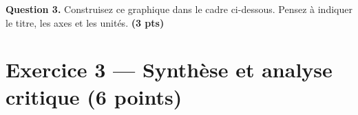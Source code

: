 \documentclass[11pt,a4paper]{article}
\begin{document}
\begin{questionbox}
\textbf{Question 3.} Construisez ce graphique dans le cadre ci-dessous. Pensez à indiquer le titre, les axes et les unités. \hfill \textbf{(3 pts)}

\vspace{0.3cm}
\begin{center}
\end{center}
\end{questionbox}

\newpage

\section*{Exercice 3 — Synthèse et analyse critique \hfill \normalfont\normalsize(6 points)}
\end{document}
